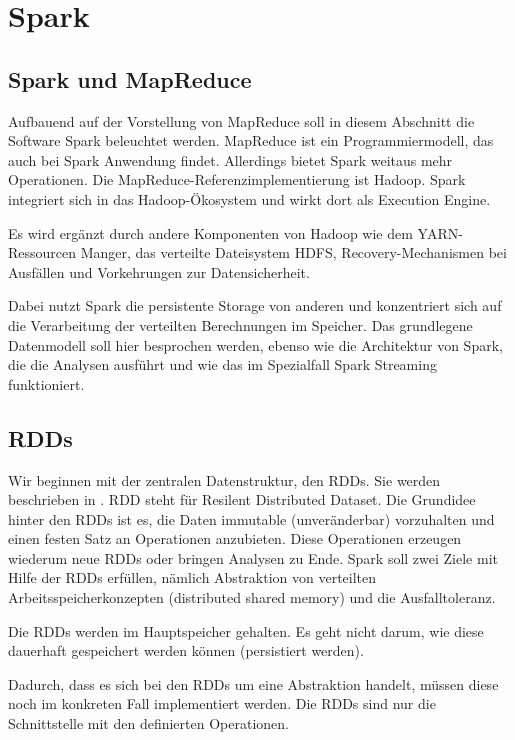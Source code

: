 \chapter{Spark}
\label{Spark}

\section[Spark und MapReduce]{\rmfamily Spark
und MapReduce}
{
Aufbauend auf der Vorstellung von MapReduce soll in diesem Abschnitt die
Software Spark beleuchtet werden. MapReduce ist ein Programmiermodell,
das auch bei Spark Anwendung findet. Allerdings bietet Spark weitaus
mehr Operationen. Die MapReduce-Referenzimplementierung ist Hadoop.
Spark integriert sich in das Hadoop-Ökosystem und wirkt dort als
Execution Engine.}

{
Es wird ergänzt durch andere Komponenten von Hadoop wie dem
YARN-Ressourcen Manger, das verteilte Dateisystem HDFS,
Recovery-Mechanismen bei Ausfällen und Vorkehrungen zur
Datensicherheit.}

{
Dabei nutzt Spark die persistente Storage von anderen und konzentriert
sich auf die Verarbeitung der verteilten Berechnungen im Speicher. Das
grundlegene Datenmodell soll hier besprochen werden, ebenso wie die
Architektur von Spark, die die Analysen ausführt und wie das im Spezialfall
Spark Streaming funktioniert.}

\section[RDDs]{\rmfamily RDDs}
Wir beginnen mit der zentralen Datenstruktur, den RDDs. Sie werden beschrieben
in \cite{Originalpaper}. RDD steht für
Resilent Distributed Dataset. Die Grundidee hinter den RDDs ist es, die
Daten immutable (unveränderbar) vorzuhalten und einen festen Satz an
Operationen anzubieten. Diese Operationen erzeugen wiederum neue RDDs
oder bringen Analysen zu Ende. Spark soll zwei Ziele mit Hilfe der RDDs
erfüllen, nämlich Abstraktion von verteilten Arbeitsspeicherkonzepten
(distributed shared memory) und die Ausfalltoleranz.

Die RDDs werden im Hauptspeicher gehalten. Es geht nicht darum, wie
diese dauerhaft gespeichert werden können (persistiert werden).

Dadurch, dass es sich bei den RDDs um eine Abstraktion handelt, müssen
diese noch im konkreten Fall implementiert werden. Die RDDs sind nur
die Schnittstelle mit den definierten Operationen.

